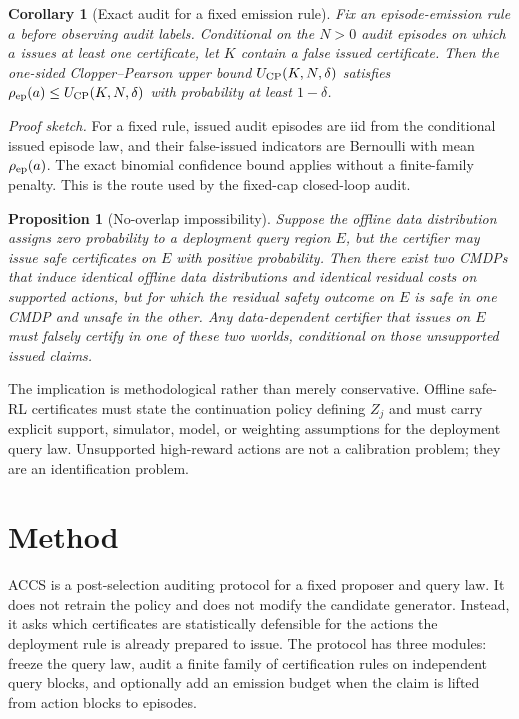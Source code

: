 \documentclass[letterpaper]{article}
\newtheorem{corollary}{Corollary}
\newtheorem{proposition}{Proposition}
\begin{document}
\begin{corollary}[Exact audit for a fixed emission rule]
Fix an episode-emission rule $a$ before observing audit labels. Conditional on
the $N>0$ audit episodes on which $a$ issues at least one certificate, let $K$
contain a false issued certificate. Then the one-sided Clopper--Pearson upper
bound $U_{\rm CP}(K,N,\delta)$ satisfies
$\rho_{\rm ep}(a)\le U_{\rm CP}(K,N,\delta)$ with probability at least
$1-\delta$.
\end{corollary}

\noindent\textit{Proof sketch.}
For a fixed rule, issued audit episodes are iid from the conditional issued
episode law, and their false-issued indicators are Bernoulli with mean
$\rho_{\rm ep}(a)$. The exact binomial confidence bound applies without a
finite-family penalty. This is the route used by the fixed-cap closed-loop
audit.

\begin{proposition}[No-overlap impossibility]
Suppose the offline data distribution assigns zero probability to a deployment
query region $E$, but the certifier may issue safe certificates on $E$ with
positive probability. Then there exist two CMDPs that induce identical offline
data distributions and identical residual costs on supported actions, but for
which the residual safety outcome on $E$ is safe in one CMDP and unsafe in the
other. Any data-dependent certifier that issues on $E$ must falsely certify in
one of these two worlds, conditional on those unsupported issued claims.
\end{proposition}

The implication is methodological rather than merely conservative. Offline
safe-RL certificates must state the continuation policy defining $Z_j$ and must
carry explicit support, simulator, model, or weighting assumptions for the
deployment query law. Unsupported high-reward actions are not a calibration
problem; they are an identification problem.

\section{Method}

ACCS is a post-selection auditing protocol for a fixed proposer and query law.
It does not retrain the policy and does not modify the candidate generator.
Instead, it asks which certificates are statistically defensible for the
actions the deployment rule is already prepared to issue. The protocol has
three modules: freeze the query law, audit a finite family of certification
rules on independent query blocks, and optionally add an emission budget when
the claim is lifted from action blocks to episodes.
\end{document}
